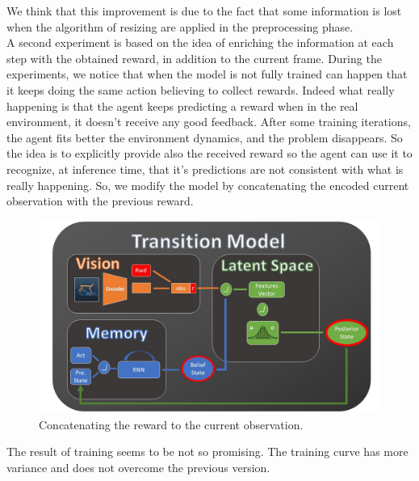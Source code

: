 We think that this improvement is due to the fact that some information is lost when the algorithm of resizing are applied in the preprocessing phase.
\\
A second experiment is based on the idea of enriching the information at each step with the obtained reward, in addition to the current frame. During the experiments, we notice that when the model is not fully trained can happen that it keeps doing the same action believing to collect rewards. Indeed what really happening is that the agent keeps predicting a reward when in the real environment, it doesn't receive any good feedback.
After some training iterations, the agent fits better the environment dynamics, and the problem disappears. So the idea is to explicitly provide also the received reward so the agent can use it to recognize, at inference time, that it's predictions are not consistent with what is really happening. So, we modify the model by concatenating the encoded current observation with the previous reward.

\begin{figure}[H]
\centering
\includegraphics[width=1. \textwidth, height=.35\textheight]{pictures/planet_pred_as_rew}
\caption{ Concatenating the reward to the current observation.}
\end{figure}
The result of training seems to be not so promising. The training curve has more variance and does not overcome the previous version. 

